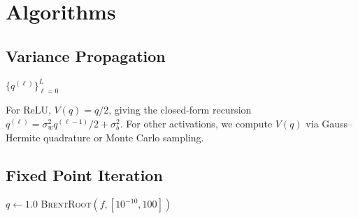 \documentclass[10pt]{article}
\theoremstyle{definition}
\begin{document}
\clearpage
\appendix
\renewcommand{\thesection}{A\arabic{section}}
\setcounter{section}{0}

\section{Algorithms}
\label{app:algorithms}

\subsection{Variance Propagation}
\label{app:alg-variance}

\begin{algorithm}[H]
\SetAlgoLined
{}
\Return $\{q^{(\ell)}\}_{\ell=0}^{L}$\;
\caption{Forward Variance Propagation}
\label{alg:variance-prop}
\end{algorithm}

For ReLU, $V(q) = q/2$, giving the closed-form recursion $q^{(\ell)} = \sigma_w^2 q^{(\ell-1)}/2 + \sigma_b^2$.
For other activations, we compute $V(q)$ via Gauss--Hermite quadrature or Monte Carlo sampling.

\subsection{Fixed Point Iteration}
\label{app:alg-fp}

\begin{algorithm}[H]
\SetAlgoLined
{}
$q \leftarrow 1.0$\;
\Return \textsc{BrentRoot}$(f, [10^{-10}, 100])$\;
\caption{Fixed Point Iteration with Fallback}
\label{alg:fixed-point}
\end{algorithm}
\end{document}
